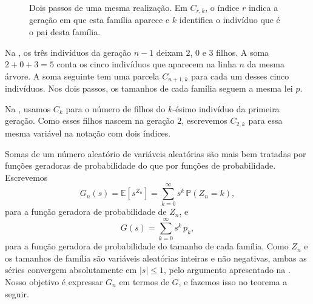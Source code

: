 \documentclass[12pt,portuguese]{article}
\theoremstyle{definition}
\theoremstyle{plainexercise}
\theoremstyle{starredexercise}
\theoremstyle{definition}
\begin{document}
\begin{figure}[H]
  \caption{Dois passos de uma mesma realização. Em $C_{r,k}$, o índice $r$
    indica a geração em que esta família aparece e $k$ identifica 
    o indivíduo que é o pai desta família.}
  \label{fig:recursao-geracoes}
\end{figure}

Na , os três indivíduos da geração $n-1$
deixam $2$, $0$ e $3$ filhos. A soma $2+0+3=5$ conta os cinco indivíduos
que aparecem na linha $n$ da mesma árvore. A soma seguinte tem uma
parcela $C_{n+1,k}$ para cada um desses cinco indivíduos. Nos dois passos,
os tamanhos de cada família seguem a mesma lei $p$.

Na , usamos $C_k$ para o número de filhos do
$k$-ésimo indivíduo da primeira geração. Como esses filhos nascem na
geração $2$, escrevemos $C_{2,k}$ para essa mesma variável na notação com
dois índices.


\bigskip 

Somas de um número aleatório de variáveis aleatórias são mais bem
tratadas por funções geradoras de probabilidade do que por funções de
probabilidade. Escrevemos
\begin{equation}\label{eq:def-fgp-geracao}
G_n(s)=\mathbb{E}[s^{Z_n}]
=\sum_{k=0}^{\infty}s^k\,\mathbb{P}(Z_n=k),
\end{equation}
para a função geradora de probabilidade de $Z_n$, e
\begin{equation}\label{eq:def-fgp-familia}
G(s)=\sum_{k=0}^{\infty}s^k\,p_k,
\end{equation}
para a função geradora de probabilidade do tamanho de cada família.
Como $Z_n$ e os tamanhos de família são variáveis aleatórias inteiras e
não negativas, ambas as séries convergem absolutamente em
$|s|\leqslant 1$, pelo argumento apresentado na .
Nosso objetivo é expressar $G_n$ em termos de $G$, e fazemos isso no
teorema a seguir.
\end{document}
